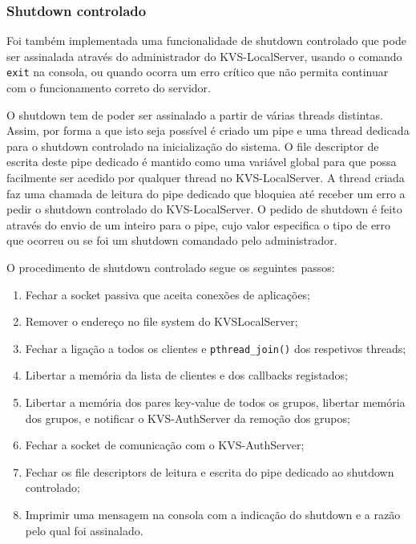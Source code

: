 \subsubsection{Shutdown controlado}
Foi também implementada uma funcionalidade de shutdown controlado que pode ser assinalada através do administrador do KVS-LocalServer, usando o comando \texttt{exit} na consola, ou quando ocorra um erro crítico que não permita continuar com o funcionamento correto do servidor.

O shutdown tem de poder ser assinalado a partir de várias threads distintas. Assim, por forma a que isto seja possível é criado um pipe e uma thread dedicada para o shutdown controlado na inicialização do sistema. O file descriptor de escrita deste pipe dedicado é mantido como uma variável global para que possa facilmente ser acedido por qualquer thread no KVS-LocalServer. A thread criada faz uma chamada de leitura do pipe dedicado que bloquiea até receber um erro a pedir o shutdown controlado do KVS-LocalServer. O pedido de shutdown é feito através do envio de um inteiro para o pipe, cujo valor especifica o tipo de erro que ocorreu ou se foi um shutdown comandado pelo administrador.

O procedimento de shutdown controlado segue os seguintes passos:
\begin{enumerate}[noitemsep]
    \item Fechar a socket passiva que aceita conexões de aplicações;
    \item Remover o endereço no file system do KVSLocalServer;
    \item Fechar a ligação a todos os clientes e \texttt{pthread\_join()} dos respetivos threads;
    \item Libertar a memória da lista de clientes e dos callbacks registados;
    \item Libertar a memória dos pares key-value de todos os grupos, libertar memória dos grupos, e notificar o KVS-AuthServer da remoção dos grupos;
    \item Fechar a socket de comunicação com o KVS-AuthServer;
    \item Fechar os file descriptors de leitura e escrita do pipe dedicado ao shutdown controlado;
    \item Imprimir uma mensagem na consola com a indicação do shutdown e a razão pelo qual foi assinalado.
\end{enumerate}

